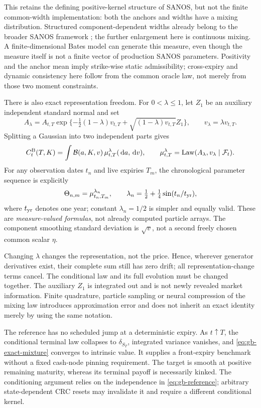 \documentclass[11pt,a4paper]{article}
\numberwithin{equation}{section}
\theoremstyle{definition}\newtheorem{definition}[theorem]{Definition}
\theoremstyle{remark}\newtheorem{remark}[theorem]{Remark}
\newcommand{\F}{\mathcal F}\newcommand{\G}{\mathcal G}
\newcommand{\dd}{\,\mathrm d}\newcommand{\dt}{\,\mathrm dt}
\newcommand{\Black}{\mathcal B}\newcommand{\LC}{\mathcal L}
\begin{document}
This retains the defining positive-kernel structure of SANOS, but not the finite common-width implementation: both the anchors and widths have a mixing distribution. Structured component-dependent widths already belong to the broader SANOS framework \cite{SANOS}; the further enlargement here is continuous mixing. A finite-dimensional Bates model can generate this measure, even though the measure itself is not a finite vector of production SANOS parameters. Positivity and the anchor mean imply strike-wise static admissibility; cross-expiry and dynamic consistency here follow from the common oracle law, not merely from those two moment constraints.

There is also exact representation freedom. For $0<\lambda\leq1$, let $Z_1$ be an auxiliary independent standard normal and set
\begin{equation}
 A_\lambda=A_{t,T}\exp\{-\tfrac12(1-\lambda)v_{t,T}
                         +\sqrt{(1-\lambda)v_{t,T}}Z_1\},
 \qquad v_\lambda=\lambda v_{t,T}.
 \label{eq:gb-split}
\end{equation}
Splitting a Gaussian into two independent parts gives
\begin{equation}
 C_t^{\rm B}(T,K)=\int\Black(a,K,v)\,
       \mu^\lambda_{t,T}(\dd a,\dd v),\qquad
 \mu^\lambda_{t,T}=\operatorname{Law}(A_\lambda,v_\lambda\mid\F_t).
 \label{eq:gb-split-price}
\end{equation}
For any observation dates $t_n$ and live expiries $T_m$, the chronological parameter sequence is explicitly
\[
 \Theta_{n,m}=\mu^{\lambda_n}_{t_n,T_m},\qquad
 \lambda_n=\tfrac12+\tfrac14\sin(t_n/t_{\rm yr}),
\]
where $t_{\rm yr}$ denotes one year; constant $\lambda_n=1/2$ is simpler and equally valid. These are \emph{measure-valued formulas}, not already computed particle arrays. The component smoothing standard deviation is $\sqrt v$, not a second freely chosen common scalar $\eta$.

Changing $\lambda$ changes the representation, not the price. Hence, wherever generator derivatives exist, their complete sum still has zero drift; all representation-change terms cancel. The conditional law and its full evolution must be changed together. The auxiliary $Z_1$ is integrated out and is not newly revealed market information. Finite quadrature, particle sampling or neural compression of the mixing law introduces approximation error and does not inherit an exact identity merely by using the same notation.

The reference has no scheduled jump at a deterministic expiry. As $t\uparrow T$, the conditional terminal law collapses to $\delta_{S_T}$, integrated variance vanishes, and \eqref{eq:gb-exact-mixture} converges to intrinsic value. It supplies a front-expiry benchmark without a fixed cash-node pinning requirement. The target is smooth at positive remaining maturity, whereas its terminal payoff is necessarily kinked. The conditioning argument relies on the independence in \eqref{eq:gb-reference}; arbitrary state-dependent CRC resets may invalidate it and require a different conditional kernel.
\end{document}
